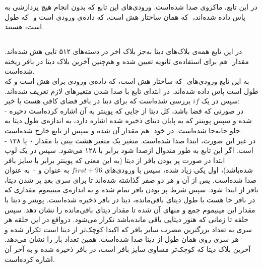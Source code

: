 در این تابع، ماکروی\hyperref[subsec:skein-big-core]{} صدا شده‌است. ورودی‌های این تابع که بدون انجام هیچ پردازشی به \hyperref[subsec:skein-big-core]{} پاس داده‌ شده‌اند،‌ ‌ که همان ساختار هش است،  که داده‌ی ورودی است و ‌ که طول   است، هستند.


\subsection{}
\label{subsec:skein-big-core}

در این تابع  همه‌ی بلاک‌های دیتا به‌جز بلاک اخر در دسته‌های ۵۱۲ تایی هش شده‌اند. مقدار ‌ هم برای استفاده‌ی ثانویه تعیین شده و هم‌چنین آخرین بلاک دیتا در بافر ریخته‌ شده‌است. \\به این تابع ورودی‌های ‌ که  ساختار هش است،  که داده‌ی ورودی برای هش است و  که طول  است پاس داده شده‌اند. در ابتدای تابع با صدا شدن \hyperref[subsec:DECL-STATE-BIG]{} متغیرهای لازم تعریف شده‌اند. سپس در یک $ if $ بررسی شده‌است که برای دیتا در بافر فضای کافی هست یا خیر: \\
- در صورتی که فضا باشد،‌ کل دیتا از جایی که پوینتر به آن اشاره کرده‌است دخیره شده‌ و سپس پوینتر که به پایان دیتای ذخیره شده اشاره دارد، به اندازه‌ی طول دیتا به جلو جابه‌جا شده‌است. در خود ‌ هم مقدار ‌آن  شده‌ و سپس از تابع خارج شده‌است.
\\
- در غیر این صورت، ابتدا  \hyperref[subsec:READ-STATE-BIG]{} صدا شده‌است. متغیر  یک متغیر هشت بیتی با  مقدار ۰ یا ۱۲۸ است. اگر این تابع به طور متدوال از\hyperref[subsec:skein-hash]{}صدا شود  برابر با ۱۲۸ می‌شود. سپس در یک لوپ ابتدا در صورت پر بودن بافر از دیتا (به این معنی که پوینتر برابر با سایز بافر شده‌باشد)،‌ اول   یکی زیاد شده، سپس\hyperref[subsec:UBI-BIG]{} با ورودی‌های $ first + 96 $ به عنوان  و ۰ به عنوان  صدا شده‌است. پس از آن  و  هر دو صفر گذاشته شده‌اند تا برای سری بعدِ پر شدن دیتا، بافر از ابتدا  شود. سپس شرط پر بودن بافر تمام شده و به اندازه‌ی مینیموم مقداری که در بافر جا هست با طول دیتای باقی‌مانده، دیتا در بافر ذخیره شده‌است. پوینتر و دیتا با مقدار این مینیموم جمع و  منهای آن شده‌ تا مقدار دیتای باقی‌مانده را نشان دهد. سپس حلقه تا زمانی که هنوز دیتایی باقی مانده‌باشد تکرار می‌شود. درواقع در این حلقه هر سری به تعداد بزرگترین مضرب سایز بافر که اکیدا کوچک‌تر از  دیتا است تکرار شده و هر سری روی همان طول از دیتا \hyperref[subsec:UBI-BIG]{} صدا شده‌است.  همین تعداد بار را نشان می‌دهد. آخرین بلاک دیتا که کوچک‌تر مساوی سایز بافر است، در بافر ذخیره شده و  به آخر آن اشاره کرده‌است.
